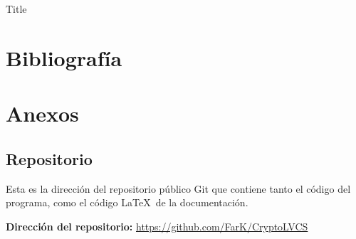 \documentclass[a4paper,12pt]{article}
\begin{document}
{Title}

\tableofcontents
\newpage


\section{Bibliografía}
\nocite{*}



\newpage
\section{Anexos}
\subsection{Repositorio}
Esta es la dirección del repositorio público Git que contiene tanto el código
del programa, como el código \LaTeX\ de la documentación.

\textbf{Dirección del repositorio:} \url{https://github.com/FarK/CryptoLVCS}
\end{document}
